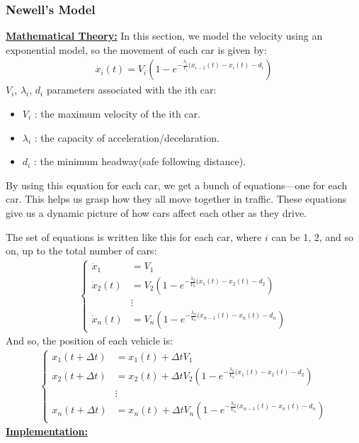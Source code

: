\documentclass{article}
\begin{document}
		\subsubsection{Newell's Model}
		\textbf{\underline{Mathematical Theory:}}
		In this section, we model the velocity using an exponential model, so the movement of each car is given by:
		\begin{align*}
			\dot{x_i}(t) =V_i(1-e^{-\frac{\lambda_i}{V_i}(x_{i-1}(t) - x_i(t) - d_i})
		\end{align*} 
		$V_i$, $\lambda_i$, $d_i$ parameters associated with the ith car:
		\begin{itemize}
			\item $V_i$ : the maximum velocity of the ith car.
			\item $\lambda_i$ : the capacity of acceleration/decelaration.
			\item $d_i$ : the minimum headway(safe following distance). 
		\end{itemize}
		By using this equation for each car, we get a bunch of equations—one for each car. This helps us grasp how they all move together in traffic. These equations give us a dynamic picture of how cars affect each other as they drive.\newline
		
		The set of equations is written like this for each car, where $i$ can be 1, 2, and so on, up to the total number of cars:
		\begin{align*}
			\left\{
			\begin{array}{ll}
				\dot{x}_1 &= V_1 \\
				\dot{x}_2(t) &= V_2(1-e^{-\frac{\lambda_2}{V_2}(x_{1}(t) - x_2(t) - d_2}) \\
				&\vdots \\
				\dot{x}_n(t) &= V_n(1-e^{-\frac{\lambda_n}{V_n}(x_{n-1}(t) - x_n(t) - d_n})
			\end{array}
			\right.
		\end{align*}
		\newline
		And so, the position of each vehicle is:
		\begin{align*}
			\left\{
			\begin{array}{ll}
				x_1(t + \Delta t) &= x_1(t) + \Delta t   V_1\\
				x_2(t + \Delta t) &= x_2(t) + \Delta t  V_2(1-e^{-\frac{\lambda_2}{V_2}(x_{1}(t) - x_2(t) - d_2}) \\
				&\vdots \\
				x_n(t + \Delta t) &= x_n(t) + \Delta t  V_n(1-e^{-\frac{\lambda_n}{V_n}(x_{n-1}(t) - x_n(t) - d_n})
			\end{array}
			\right.
		\end{align*}
		\textbf{\underline{Implementation:}} \newline\newline
		
\end{document}
